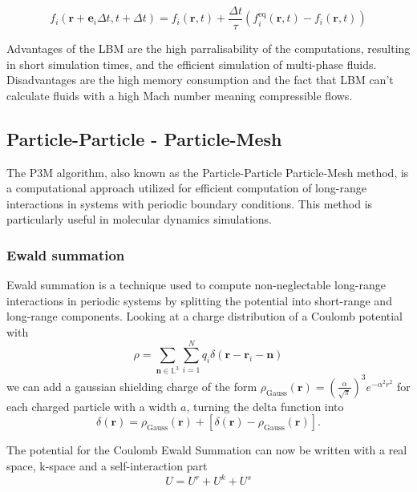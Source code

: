 \begin{equation}
f_i(\mathbf{r} + \mathbf{e}_i \Delta t, t + \Delta t) = f_i(\mathbf{r}, t) + \frac{\Delta t}{\tau} \left( f_i^{\text{eq}}(\mathbf{r}, t) - f_i(\mathbf{r}, t) \right)
\end{equation}

Advantages of the LBM are the high parralisability of the computations, resulting in short simulation times, and the efficient simulation of multi-phase fluids.
Disadvantages are the high memory consumption and the fact that LBM can't calculate fluids with a high Mach number meaning compressible flows.



\subsection{Particle-Particle - Particle-Mesh}

The P3M algorithm, also known as the Particle-Particle Particle-Mesh method, is a computational approach utilized for efficient computation of long-range interactions in systems with periodic boundary conditions. This method is particularly useful in molecular dynamics simulations.

\subsubsection{Ewald summation}
Ewald summation is a technique used to compute non-neglectable long-range interactions in periodic systems by splitting the potential into short-range and long-range components. Looking at a charge distribution of a Coulomb potential with 
\begin{equation}
\rho = \sum_{\mathbf{n} \in \mathbb{L}^3} \sum_{i=1}^{N} q_i \delta(\mathbf{r} - \mathbf{r}_i - \mathbf{n})
\end{equation}
we can add a gaussian shielding charge of the form
$ \rho_{\text{Gauss}}(\mathbf{r}) = \left( \frac{\alpha}{\sqrt{\pi}} \right)^3 e^{-\alpha^2 r^2}$ 
for each charged particle  with a width $a$, turning the delta function into
\begin{equation}
\delta(\mathbf{r}) = \rho_{\text{Gauss}}(\mathbf{r})+ {[\delta(\mathbf{r}) - \rho_{\text{Gauss}}(\mathbf{r})]}.
\end{equation}

The potential for the Coulomb Ewald Summation can now be written with a real space, k-space and a self-interaction part
\begin{equation}
  U = U^{r} + U^{k} + U^{s}
\end{equation}

